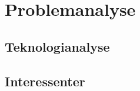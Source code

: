 \chapter{Problemanalyse}\label{sec:problemanalyse}

\section{Teknologianalyse}
\section{Interessenter}
\clearpage